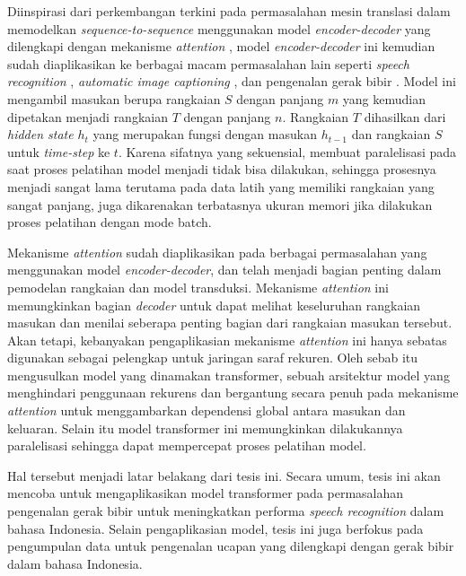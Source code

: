 Diinspirasi dari perkembangan terkini pada permasalahan mesin translasi dalam memodelkan \textit{sequence-to-sequence} menggunakan model \textit{encoder-decoder} yang dilengkapi dengan mekanisme \textit{attention} \parencite{Bahdanau2015}, model \textit{encoder-decoder} ini kemudian sudah diaplikasikan ke berbagai macam permasalahan lain seperti \textit{speech recognition} \parencite{Chan2015}, \textit{automatic image captioning} \parencite{Vinyals2014} \parencite{Xu2015}, dan pengenalan gerak bibir \parencite{Chung2017}. Model ini mengambil masukan berupa rangkaian \(S\) dengan panjang \(m\) yang kemudian dipetakan menjadi rangkaian \(T\) dengan panjang \(n\). Rangkaian \(T\) dihasilkan dari \textit{hidden state} \(h_{t}\) yang merupakan fungsi dengan masukan \(h_{t-1}\) dan rangkaian \(S\) untuk \textit{time-step} ke \(t\). Karena sifatnya yang sekuensial, membuat paralelisasi pada saat proses pelatihan model menjadi tidak bisa dilakukan, sehingga prosesnya menjadi sangat lama terutama pada data latih yang memiliki rangkaian yang sangat panjang, juga dikarenakan terbatasnya ukuran memori jika dilakukan proses pelatihan dengan mode batch.
\bigskip

Mekanisme \textit{attention} sudah diaplikasikan pada berbagai permasalahan yang menggunakan model \textit{encoder-decoder}, dan telah menjadi bagian penting dalam pemodelan rangkaian dan model transduksi. Mekanisme \textit{attention} ini memungkinkan bagian \textit{decoder} untuk dapat melihat keseluruhan rangkaian masukan dan menilai seberapa penting bagian dari rangkaian masukan tersebut. Akan tetapi, kebanyakan pengaplikasian mekanisme \textit{attention} ini hanya sebatas digunakan sebagai pelengkap untuk jaringan saraf rekuren. Oleh sebab itu \textcite{Vaswani2017} mengusulkan model yang dinamakan transformer, sebuah arsitektur model yang menghindari penggunaan rekurens dan bergantung secara penuh pada mekanisme \textit{attention} untuk menggambarkan dependensi global antara masukan dan keluaran. Selain itu model transformer ini memungkinkan dilakukannya paralelisasi sehingga dapat mempercepat proses pelatihan model.
\bigskip

Hal tersebut menjadi latar belakang dari tesis ini. Secara umum, tesis ini akan mencoba untuk mengaplikasikan model transformer pada permasalahan pengenalan gerak bibir untuk meningkatkan performa \textit{speech recognition} dalam bahasa Indonesia. Selain pengaplikasian model, tesis ini juga berfokus pada pengumpulan data untuk pengenalan ucapan yang dilengkapi dengan gerak bibir dalam bahasa Indonesia.


